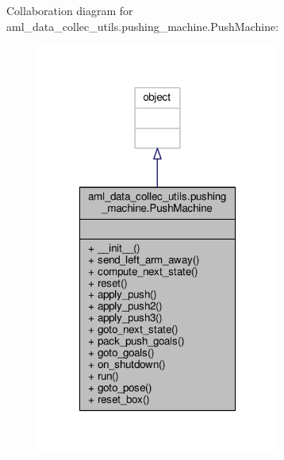 Collaboration diagram for aml\-\_\-data\-\_\-collec\-\_\-utils.\-pushing\-\_\-machine.\-Push\-Machine\-:
\nopagebreak
\begin{figure}[H]
\begin{center}
\leavevmode
\includegraphics[width=226pt]{classaml__data__collec__utils_1_1pushing__machine_1_1_push_machine__coll__graph}
\end{center}
\end{figure}
